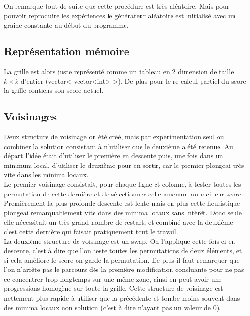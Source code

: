 \documentclass[12pt,a4paper]{article}
\begin{document}
On remarque tout de suite que cette procédure est très aléatoire. Mais pour pouvoir reproduire les expériences le générateur aléatoire est initialisé avec un graine constante au début du programme.

\subsection{Représentation mémoire}

La grille est alors juste représenté comme un tableau en 2 dimension de taille $k \times k$ d'entier (vector< vector<int> >). De plus pour le re-calcul partiel du score la grille contiens son score actuel.

\subsection{Voisinages}

Deux structure de voisinage on été créé, mais par expérimentation seul ou combiner la solution consistant à n'utiliser que le deuxième a été retenue. Au départ l’idée était d'utiliser le première en descente puis, une fois dans un minimum local, d'utiliser le deuxième pour en sortir, car le premier plongeai très vite dans les minima locaux.\\

Le premier voisinage consistait, pour chaque ligne et colonne, à tester toutes les permutation de cette dernière et de sélectionner celle amenant au meilleur score.
Premièrement la plus profonde descente est lente mais en plus cette heuristique plongeai remarquablement vite dans des minima locaux sans intérêt. Donc seule elle nécessitait un très grand nombre de restart, et combiné avec la deuxième c'est cette dernière qui faisait pratiquement tout le travail.\\

La deuxième structure de voisinage est un swap. On l'applique cette fois ci en descente, c'est à dire que l'on teste toutes les permutations de deux éléments, et si cela améliore le score on garde la permutation. De plus il faut remarquer que l'on n’arrête pas le parcours dès la première modification concluante pour ne pas ce concentrer trop longtemps sur une même zone, ainsi on peut avoir une progressions homogène sur toute la grille. Cette structure de voisinage est nettement plus rapide à utiliser que la précédente et tombe moins souvent dans des minima locaux non solution (c'est à dire n'ayant pas un valeur de 0).\\
\end{document}
